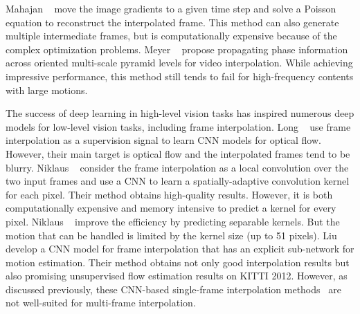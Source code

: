 \documentclass[10pt,twocolumn,letterpaper]{article}
\begin{document}
Mahajan \etal~\cite{mahajan2009moving}  move the image gradients to a given time step and solve a Poisson equation to reconstruct the interpolated frame. This method can also generate multiple intermediate frames, but is computationally expensive because of the complex optimization problems.
Meyer \etal~\cite{meyer15phase}  propose propagating phase information across oriented multi-scale pyramid levels for video interpolation. While achieving impressive performance, this method still tends to fail for high-frequency contents with large motions.

The success of deep learning in high-level vision tasks has inspired numerous deep models for low-level vision tasks, including frame interpolation. Long \etal~\cite{long16learning} use frame interpolation as a supervision signal to learn CNN models for optical flow. However, their main target is optical flow and the interpolated frames tend to be blurry. Niklaus \etal~\cite{niklaus17video_cvpr} consider the frame interpolation as a local convolution over the two input frames and use a CNN to learn a spatially-adaptive convolution kernel for each pixel. Their method obtains high-quality results.
However, it is both computationally expensive and memory intensive to predict a kernel for every pixel. Niklaus \etal~\cite{niklaus17video_iccv} improve the efficiency by predicting separable kernels. But the motion that can be handled is limited by the kernel size (up to 51 pixels). Liu \etal~\cite{liu17video} develop a CNN model for frame interpolation that has an explicit sub-network for motion estimation. Their method obtains not only good interpolation results but also promising unsupervised flow estimation results on KITTI 2012. 
However, as discussed previously, these CNN-based single-frame interpolation methods~\cite{niklaus17video_cvpr,niklaus17video_iccv,liu17video} are not well-suited for multi-frame interpolation. 
\end{document}
